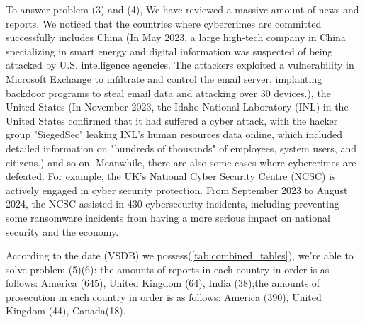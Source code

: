 \documentclass[12pt]{article}
\begin{document}
	To answer problem (3) and (4), We have reviewed a massive amount of news and reports. We noticed that the countries where cybercrimes are committed successfully includes China (In May 2023, a large high-tech company in China specializing in smart energy and digital information was suspected of being attacked by U.S. intelligence agencies. The attackers exploited a vulnerability in Microsoft Exchange to infiltrate and control the email server, implanting backdoor programs to steal email data and attacking over 30 devices.), the United States (In November 2023, the Idaho National Laboratory (INL) in the United States confirmed that it had suffered a cyber attack, with the hacker group "SiegedSec" leaking INL's human resources data online, which included detailed information on "hundreds of thousands" of employees, system users, and citizens.) and so on. Meanwhile, there are also some cases where cybercrimes are defeated. For example, the UK's National Cyber Security Centre (NCSC) is actively engaged in cyber security protection. From September 2023 to August 2024, the NCSC assisted in 430 cybersecurity incidents, including preventing some ransomware incidents from having a more serious impact on national security and the economy.
	
	According to the date (VSDB) we possess(\cref{tab:combined_tables}), we’re able to solve problem (5)(6): the amounts of reports in each country in order is as follows: America (645), United Kingdom (64), India (38);the amounts of prosecution in each country in order is as follows: America (390), United Kingdom (44), Canada(18).
	
\end{document}

